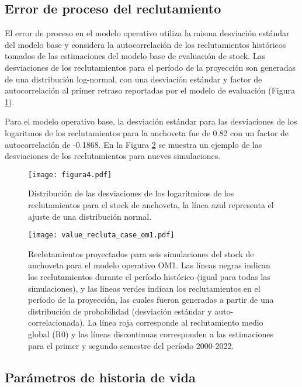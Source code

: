 
\subsection{Error de proceso del reclutamiento}

El error de proceso en el modelo operativo utiliza la misma desviación estándar del modelo base y considera la autocorrelación de los reclutamientos históricos tomados de las estimaciones del modelo base de evaluación de stock. Las desviaciones de los reclutamientos para el período de la proyección son generadas de una distribución log-normal, con una desviación estándar y factor de autocorrelación al primer retraso reportadas por el modelo de evaluación (Figura \ref{fig:figura4}). 
\newline

Para el modelo operativo base, la desviación estándar para las desviaciones de los logaritmos de los reclutamientos para la anchoveta fue de 0.82 con un factor de autocorrelación de -0.1868. En la Figura \ref{fig:figura5} se muestra un ejemplo de las desviaciones de los reclutamientos para nueves simulaciones.

\begin{figure}[H]
    \centering
    \texttt{[image: figura4.pdf]}
    \caption{Distribución de las desviaciones de los logarítmicos de los reclutamientos para el stock de anchoveta, la línea azul representa el ajuste de una distribución normal.}
    \label{fig:figura4}
\end{figure}

\begin{figure}[H]
    \centering
    \texttt{[image: value\_recluta\_case\_om1.pdf]}
    \caption{Reclutamientos proyectados para seis simulaciones del stock de anchoveta para el modelo
operativo OM1. Las líneas negras indican los reclutamientos durante el período histórico (igual para
todas las simulaciones), y las líneas verdes indican los reclutamientos en el período de la proyección, las
cuales fueron generadas a partir de una distribución de probabilidad (desviación estándar y auto-
correlacionada). La línea roja corresponde al reclutamiento medio global (R0) y las líneas discontinuas
corresponden a las estimaciones para el primer y segundo semestre del período 2000-2022.}
    \label{fig:figura5}
\end{figure}

\subsection{Parámetros de historia de vida}

